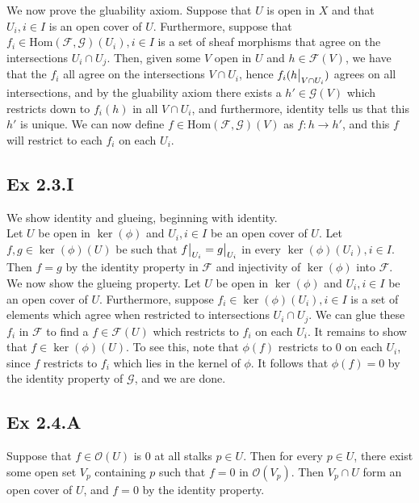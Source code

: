 \documentclass{article}
\newcommand\restr[2]{{%
  \left.\kern-\nulldelimiterspace %
  #1 %
  \vphantom{\big|} %
  \right|_{#2} %
  }}
\theoremstyle{definition}
\newcommand{\Hom}{\text{Hom}}
\begin{document}
We now prove the gluability axiom. Suppose that $U$ is open in $X$ and that
$U_i, i \in I$ is an open cover of $U$. Furthermore, suppose that $f_i \in
\Hom(\mathcal{F}, \mathcal{G})(U_i), i \in I$ is a set of sheaf morphisms that
agree on the intersections $U_i \cap U_j$. Then, given some $V$ open in $U$ and
$h \in \mathcal{F}(V)$, we have that the $f_i$ all agree on the intersections
$V \cap U_i$, hence $f_i(\restr{h}{V \cap U_i})$ agrees on all intersections,
and by the gluability axiom there exists a $h' \in \mathcal{G}(V)$ which
restricts down to $f_i(h)$ in all $V \cap U_i$, and furthermore, identity tells
us that this $h'$ is unique. We can now define $f \in \Hom(\mathcal{F},
\mathcal{G})(V)$ as $f : h \to h'$, and this $f$ will restrict to each $f_i$ on
each $U_i$.

\subsection*{Ex 2.3.I}

We show identity and glueing, beginning with identity. \\

Let $U$ be open in $\ker(\phi)$ and $U_i, i \in I$ be an open cover of $U$. Let
$f, g \in \ker(\phi)(U)$ be such that $\restr{f}{U_i} = \restr{g}{U_i}$ in
every $\ker(\phi)(U_i), i \in I$. Then $f = g$ by the identity property in
$\mathcal{F}$ and injectivity of $\ker(\phi)$ into $\mathcal{F}$. \\

We now show the glueing property. Let $U$ be open in $\ker(\phi)$ and $U_i, i
\in I$ be an open cover of $U$. Furthermore, suppose $f_i \in \ker(\phi)(U_i),
i \in I$ is a set of elements which agree when restricted to intersections $U_i
\cap U_j$. We can glue these $f_i$ in $\mathcal{F}$ to find a $f \in
\mathcal{F}(U)$ which restricts to $f_i$ on each $U_i$. It remains to show that
$f \in \ker(\phi)(U)$. To see this, note that $\phi(f)$ restricts to $0$ on
each $U_i$, since $f$ restricts to $f_i$ which lies in the kernel of $\phi$. It follows 
that $\phi(f) = 0$ by the identity property of $\mathcal{G}$, and we are done.


\subsection*{Ex 2.4.A}

Suppose that $f \in \mathcal{O}(U)$ is $0$ at all stalks $p \in U$. Then for
every $p \in U$, there exist some open set $V_p$ containing $p$ such that $f =
0$ in $\mathcal{O}(V_p)$. Then $V_p \cap U$ form an open cover of $U$, and $f =
0$ by the identity property. 
\end{document}
